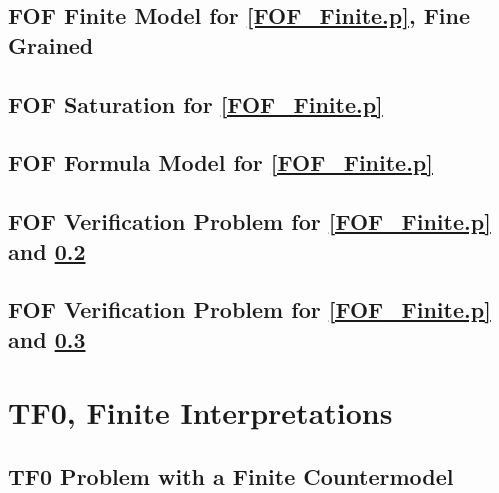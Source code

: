 \documentclass{easychair}
\begin{document}
\newpage
\subsection{FOF Finite Model for \ref{FOF_Finite.p}, Fine Grained}
\label{FOF_Finite_Fine.s}
\begin{small}

\end{small}

\newpage
\subsection{FOF Saturation for \ref{FOF_Finite.p}}
\label{FOF_Saturation.s}
\begin{small}

\end{small}

\newpage
\subsection{FOF Formula Model for \ref{FOF_Finite.p}}
\label{FOF_Formulae.s}
\begin{small}

\end{small}

\newpage
\subsection{FOF Verification Problem for \ref{FOF_Finite.p} and \ref{FOF_Saturation.s}}
\label{FOF_Saturation.s.p}
\begin{small}

\end{small}

\newpage
\subsection{FOF Verification Problem for \ref{FOF_Finite.p} and \ref{FOF_Formulae.s}}
\label{FOF_Formulae.s.p}
\begin{small}

\end{small}

\newpage
\section{TF0, Finite Interpretations}
\label{TF0Finite}

\subsection{TF0 Problem with a Finite Countermodel}
\label{TFF_Finite.p}
\begin{small}

\end{small}
\end{document}
